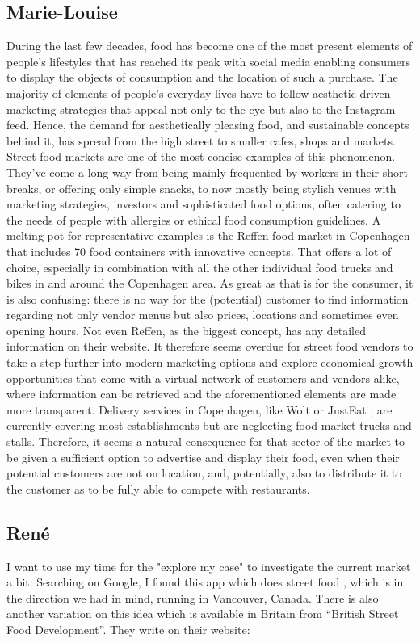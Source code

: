 \subsection{Marie-Louise}
During the last few decades, food has become one of the most present elements of people’s lifestyles that has reached its peak with social media enabling consumers to display the objects of consumption and the location of such a purchase. The majority of elements of people’s everyday lives have to follow aesthetic-driven marketing strategies that appeal not only to the eye but also to the Instagram feed. Hence, the demand for aesthetically pleasing food, and sustainable concepts behind it, has spread from the high street to smaller cafes, shops and markets. Street food markets are one of the most concise examples of this phenomenon. They’ve come a long way from being mainly frequented by workers in their short breaks, or offering only simple snacks, to now mostly being stylish venues with marketing strategies, investors and sophisticated food options, often catering to the needs of people with allergies or ethical food consumption guidelines. A melting pot for representative examples is the Reffen food market in Copenhagen that includes 70 food containers with innovative concepts. That offers a lot of choice, especially in combination with all the other individual food trucks and bikes in and around the Copenhagen area. As great as that is for the consumer, it is also confusing: there is no way for the (potential) customer to find information regarding not only vendor menus but also prices, locations and sometimes even opening hours.
%
Not even Reffen, as the biggest concept, has any detailed information on their website. It therefore seems overdue for street food vendors to take a step further into modern marketing options and explore economical growth opportunities that come with a virtual network of customers and vendors alike, where information can be retrieved and the aforementioned elements are made more transparent. Delivery services in Copenhagen, like Wolt or JustEat \cite{JustEat}, are currently covering most establishments but are neglecting food market trucks and stalls. Therefore, it seems a natural consequence for that sector of the market to be given a sufficient option to advertise and display their food, even when their potential customers are not on location, and, potentially, also to distribute it to the customer as to be fully able to compete with restaurants.

\subsection{René}
I want to use my time for the "explore my case" to investigate the current market a bit:
Searching on Google, I found this app which does street food \cite{streetfoodapp}, which is in the direction we had in mind, running in Vancouver, Canada. There is also another variation on this idea which is available in Britain from “British Street Food Development”. They write on their website:

